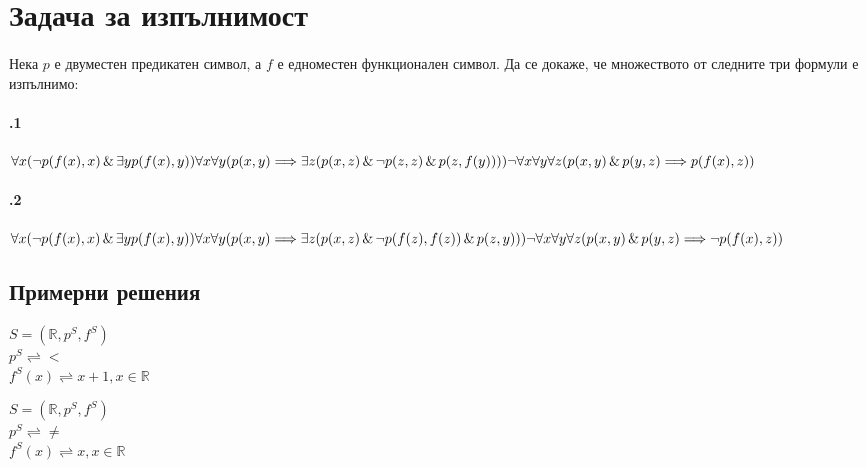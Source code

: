 \documentclass{article}
\begin{document}
\newpage
\section{Задача за изпълнимост}
\paragraph{}
Нека $p$ е двуместен предикатен символ, а $f$ е едноместен функционален символ. Да се докаже, че множеството от следните три формули е изпълнимо: 
\paragraph{\hspace{0.5em} .1} 
\begin{addmargin}[1em]{2em}
$\forall x(\neg p(f(x),x) \, \& \, \exists y p(f(x),y)) \\
\forall x \forall y ( p(x, y) \Longrightarrow \exists z (p(x, z) \, \& \, \neg p(z,z) \, \& \, p(z, f(y)))) \\
\neg \forall x \forall y \forall z (p(x, y) \, \& \, p(y, z) \Longrightarrow  p(f(x), z))$
\end{addmargin}

\vskip 0.2in

\paragraph{\hspace{0.5em} .2} 
\begin{addmargin}[1em]{2em}
$\forall x(\neg p(f(x),x) \, \& \, \exists y p(f(x),y)) \\
\forall x \forall y ( p(x, y) \Longrightarrow \exists z (p(x, z) \, \& \, \neg p(f(z),f(z)) \, \& \, p(z, y))) \\
\neg \forall x \forall y \forall z (p(x, y) \, \& \, p(y, z) \Longrightarrow  \neg p(f(x), z))$
\end{addmargin}

\subsection{Примерни решения}
\begin{addmargin}[1em]{2em}
\begin{center}
$ S = ( \mathbb{R}, p^S, f^S)$ \\
$p^S \rightleftharpoons  < $ \\
$f^S(x)\rightleftharpoons x + 1, x \in \mathbb{R}$
\end{center}
\end{addmargin}
\vskip 0.2in
\begin{addmargin}[1em]{2em}
\begin{center}
$ S = ( \mathbb{R}, p^S, f^S)$ \\
$p^S \rightleftharpoons \neq $ \\
$f^S(x)\rightleftharpoons x , x \in \mathbb{R}$
\end{center}
\end{addmargin}
\end{document}

